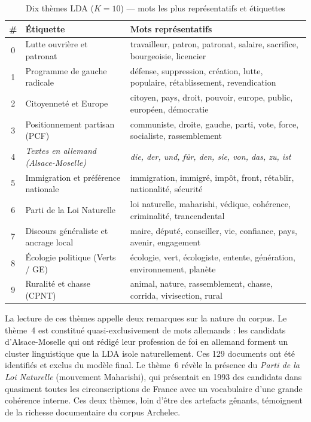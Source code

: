 \documentclass{article}
\begin{document}
\begin{table}[h]
\caption{Dix thèmes LDA ($K=10$) — mots les plus représentatifs et étiquettes}
\label{tab:topics}
\centering
\small
\begin{tabular}{clp{7.2cm}}
\toprule
\# & Étiquette & Mots représentatifs \\
\midrule
0 & Lutte ouvrière et patronat
  & travailleur, patron, patronat, salaire, sacrifice, bourgeoisie, licencier \\
1 & Programme de gauche radicale
  & défense, suppression, création, lutte, populaire, rétablissement, revendication \\
2 & Citoyenneté et Europe
  & citoyen, pays, droit, pouvoir, europe, public, européen, démocratie \\
3 & Positionnement partisan (PCF)
  & communiste, droite, gauche, parti, vote, force, socialiste, rassemblement \\
4 & \textit{Textes en allemand (Alsace-Moselle)}
  & \textit{die, der, und, für, den, sie, von, das, zu, ist} \\
5 & Immigration et préférence nationale
  & immigration, immigré, impôt, front, rétablir, nationalité, sécurité \\
6 & Parti de la Loi Naturelle
  & loi naturelle, maharishi, védique, cohérence, criminalité, trancendental \\
7 & Discours généraliste et ancrage local
  & maire, député, conseiller, vie, confiance, pays, avenir, engagement \\
8 & Écologie politique (Verts / GE)
  & écologie, vert, écologiste, entente, génération, environnement, planète \\
9 & Ruralité et chasse (CPNT)
  & animal, nature, rassemblement, chasse, corrida, vivisection, rural \\
\bottomrule
\end{tabular}
\end{table}

La lecture de ces thèmes appelle deux remarques sur la nature du corpus.
Le thème~4 est constitué quasi-exclusivement de mots allemands : les candidats
d'Alsace-Moselle qui ont rédigé leur profession de foi en allemand forment un
cluster linguistique que la LDA isole naturellement. Ces 129 documents ont
été identifiés et exclus du modèle final. Le thème~6 révèle la présence du
\emph{Parti de la Loi Naturelle} (mouvement Maharishi), qui présentait en 1993
des candidats dans quasiment toutes les circonscriptions de France avec un
vocabulaire d'une grande cohérence interne. Ces deux thèmes, loin d'être des
artefacts gênants, témoignent de la richesse documentaire du corpus Archelec.
\end{document}
